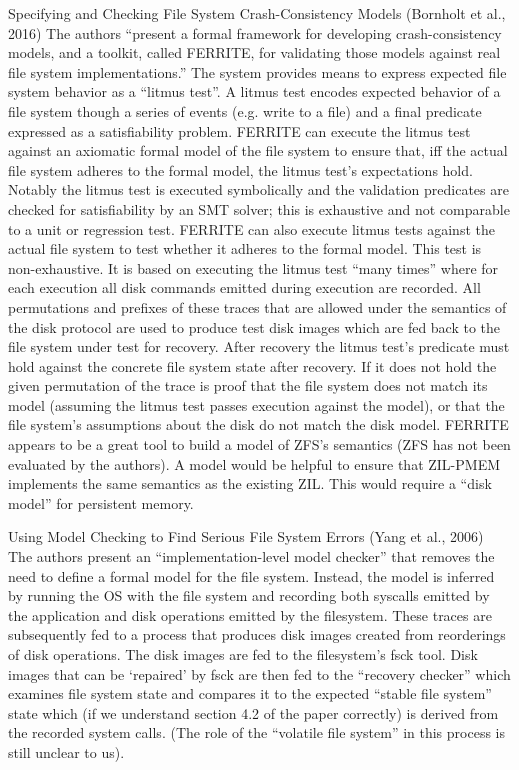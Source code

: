 \documentclass[12pt,a4paper,twoside,draft]{book}
\begin{document}
Specifying and Checking File System Crash-Consistency Models (Bornholt et al., 2016) The authors “present a formal framework for developing crash-consistency models, and a toolkit, called FERRITE, for validating those models against real file system implementations.”  The system provides means to express expected file system behavior as a “litmus test”. A litmus test encodes expected behavior of a file system though a series of events (e.g. write to a file) and a final predicate expressed as a satisfiability problem. FERRITE can execute the litmus test against an axiomatic formal model of the file system to ensure that, iff the actual file system adheres to the formal model, the litmus test’s expectations hold. Notably the litmus test is executed symbolically and the validation predicates are checked for satisfiability by an SMT solver; this is exhaustive and not comparable to a unit  or regression test.
FERRITE can also execute litmus tests against the actual file system to test whether it adheres to the formal model. This test is non-exhaustive. It is based on executing the litmus test “many times” where for each execution all disk commands emitted during execution are recorded. All permutations and prefixes of these traces that are allowed under the semantics of the disk protocol are used to produce test disk images which are fed back to the file system under test for recovery. After recovery the litmus test’s predicate must hold against the concrete file system state after recovery. If it does not hold the given permutation of the trace is proof that the file system does not match its model (assuming the litmus test passes execution against the model), or that the file system’s assumptions about the disk do not match the disk model.
FERRITE appears to be a great tool to build a model of ZFS’s semantics (ZFS has not been evaluated by the authors). A model would be helpful to ensure that ZIL-PMEM implements the same semantics as the existing ZIL. This would require a “disk model” for persistent memory.

Using Model Checking to Find Serious File System Errors (Yang et al., 2006) The authors present an “implementation-level model checker” that removes the need to define a formal model for the file system. Instead, the model is inferred by running the OS with the file system and recording both syscalls emitted by the application and disk operations emitted by the filesystem. These traces are subsequently fed to a process that produces disk images created from reorderings of disk operations. The disk images are fed to the filesystem’s fsck tool. Disk images that can be ‘repaired’ by fsck are then fed to the “recovery checker” which examines file system state and compares it to the expected “stable file system” state which (if we understand section 4.2 of the paper correctly) is derived from the recorded system calls. (The role of the “volatile file system” in this process is still unclear to us).
\end{document}
